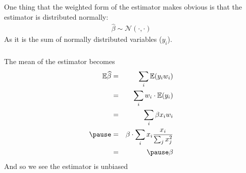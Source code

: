 \begin{frame}[fragile] \frametitle{}

One thing that the weighted form of the estimator makes
obvious is that the estimator is distributed normally:
\begin{align*}
\widehat{\beta} \sim \mathcal{N} (\cdot, \cdot)
\end{align*}
As it is the sum of normally distributed variables ($y_i$).

\end{frame}

\begin{frame}[fragile] \frametitle{}

The mean of the estimator becomes
\begin{eqnarray*}
\mathbb{E} \widehat{\beta} &=& \sum_i \mathbb{E} (y_i w_i) \\
&=& \sum_i w_i \cdot \mathbb{E} (y_i) \\
&=& \sum_i \beta x_i w_i \\ \pause
&=& \beta \cdot \sum_i x_i \frac{x_i}{\sum_j x_j^2} \\
&=& \pause \beta
\end{eqnarray*}
And so we see the estimator is unbiased

\end{frame}

\begin{frame}[fragile] \frametitle{}



\end{frame}















